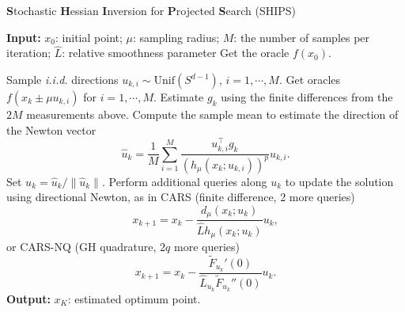 {\begin{singlespace}
    \centering
\begin{minipage}{.8\linewidth}
\begin{algorithm}[H]
    \caption{\textbf{S}tochastic \textbf{H}essian \textbf{I}nversion for \textbf{P}rojected \textbf{S}earch (SHIPS)}
    \begin{algorithmic}[1]
        \State \textbf{Input:} $x_0$: initial point; $\mu$: sampling radius; $M$: the number of samples per iteration;  $\hat{L}$: relative smoothness parameter
        \State Get the oracle $f(x_0)$.

        \State Sample \emph{i.i.d.} directions $u_{k,i} \sim \textrm{Unif}(S^{d-1})$, $i=1,\cdots,M$.
        \State Get oracles $f(x_{k} \pm \mu u_{k,i})$ for $i=1,\cdots,M$.
        \State Estimate $g_k$ using the finite differences from the $2M$ measurements above.
        \State Compute the sample mean to estimate the direction of the Newton vector
        \[
            \hat{u}_k = \frac{1}{M}\sum_{i=1}^{M} \frac{u_{k,i}^{\top}g_k}{(h_\mu(x_k;u_{k,i}))^p}u_{k,i}.
        \]
        \State  Set $u_k = \hat{u}_k / \|\hat{u}_k\|$.
        \State  Perform additional queries along $u_k$ to update the solution using directional Newton, as in CARS (finite difference, 2 more queries)
        \[
            x_{k+1} = x_k - \frac{d_\mu(x_k;u_k)}{\hat{L}h_\mu (x_k; u_k)}u_k,
        \]
        or CARS-NQ (GH quadrature, $2q$ more queries)
        \[
            x_{k+1} = x_k - \frac{\tilde{F}_{u_k}'(0)}{\hat{L}_{u_k} \tilde{F}_{u_k}'' ( 0) } u_k.
        \]
        \EndFor
        \State \textbf{Output:} $x_K$: estimated optimum point.
    \end{algorithmic}
\end{algorithm}
\end{minipage}
\par
\end{singlespace}
}


